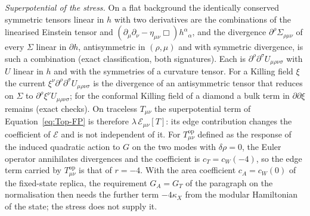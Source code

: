 \emph{Superpotential of the stress.} On a flat background the identically conserved symmetric tensors linear in \(h\) with two derivatives are the combinations of the linearised Einstein tensor and \((\partial_\mu\partial_\nu-\eta_{\mu\nu}\Box)h^\alpha{}_\alpha\), and the divergence \(\partial^\rho\Sigma_{\rho\mu\nu}\) of every \(\Sigma\) linear in \(\partial h\), antisymmetric in \((\rho,\mu)\) and with symmetric divergence, is such a combination (exact classification, both signatures). Each is \(\partial^\rho\partial^\sigma U_{\mu\rho\nu\sigma}\) with \(U\) linear in \(h\) and with the symmetries of a curvature tensor. For a Killing field \(\xi\) the current \(\xi^\nu\partial^\rho\partial^\sigma U_{\mu\rho\nu\sigma}\) is the divergence of an antisymmetric tensor that reduces on \(\Sigma\) to \(\partial^\rho\xi^\nu U_{\mu\rho\nu\sigma}\); for the conformal Killing field of a diamond a bulk term in \(\partial\partial\xi\) remains (exact checks). On traceless \(T_{\mu\nu}\) the superpotential term of Equation~\eqref{eq:Top-FP} is therefore \(\lambda\,\mathcal E_{\mu\nu}[T]\): its edge contribution changes the coefficient of \(\mathcal E\) and is not independent of it. For \(T^{\mathrm{op}}_{\mu\nu}\) defined as the response of the induced quadratic action to \(G\) on the two modes with \(\delta\rho=0\), the Euler operator annihilates divergences and the coefficient is \(c_T=c_W(-4)\), so the edge term carried by \(T^{\mathrm{op}}_{\mu\nu}\) is that of \(r=-4\). With the area coefficient \(c_A=c_W(0)\) of the fixed-state replica, the requirement \(G_A=G_T\) of the paragraph on the normalisation then needs the further term \(-4\kappa_X\) from the modular Hamiltonian of the state; the stress does not supply it.

